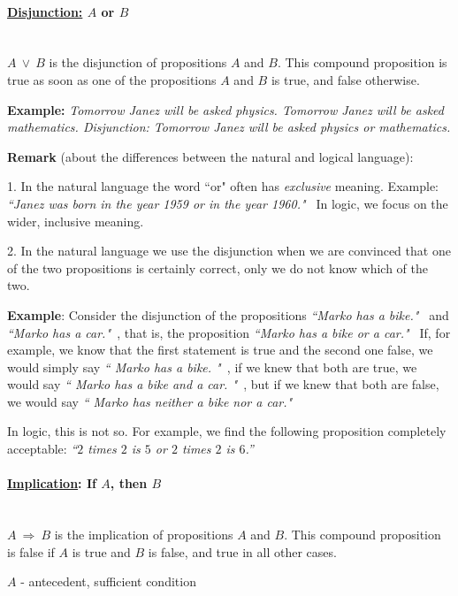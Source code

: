 \documentclass[11pt,paper=b5,footinclude,headinclude]{scrbook} %
\def\ali {{~\vee~}}
\def\sledi {{~\Rightarrow~}}
\theoremstyle{remark}
\theoremstyle{definition} %
\theoremstyle{theorem} %
\begin{document}
\medskip
\paragraph{\underline{Disjunction:} $A$ or $B$} \mbox{}\\

$A\ali B$ is the disjunction of propositions $A$ and $B$.
This compound proposition is true
as soon as one of the propositions $A$ and $B$ is true, and false otherwise.

\textbf{Example:} {\em
Tomorrow Janez will be asked physics.
Tomorrow Janez will be asked mathematics.
Disjunction:
Tomorrow Janez will be asked physics or mathematics.}

\medskip
\textbf{Remark} (about the differences between the natural and logical language):

1. In the natural language the word ``or" often has {\em exclusive} meaning.
Example: {\em ``Janez was born in the year 1959 or in the year 1960."~}
In logic, we focus on the wider, inclusive meaning.

2. In the natural language we use the disjunction when we are convinced that one of the two propositions is certainly correct,
only we do not know which of the two.

\textbf{Example}: Consider the disjunction of the propositions
{\em ``Marko has a bike."~} and {\em ``Marko has a car."~}, that is,
the proposition
{\em ``Marko has a bike or a car."~}
If, for example, we know
that the first statement is true and the second one false, we would simply say
{\em `` Marko has a bike. "~}, if we knew that both are true, we would say
{\em `` Marko has a bike and a car. "~}, but if we knew that both are false, we would say
{\em `` Marko has neither a bike nor a car."~}

In logic, this is not so. For example, we find the following proposition completely acceptable:
{\em ``$2$ times $2$ is $5$ or $2$ times $2$ is $6$.''}

\medskip
\paragraph{\underline{Implication}: If $A$, then $B$}\mbox{}\\


$A\sledi B$ is the implication of propositions $A$ and $B$.
This compound proposition is false if $A$ is true and $B$ is false, and true in all other cases.

$A$ - antecedent, sufficient condition
\end{document}
